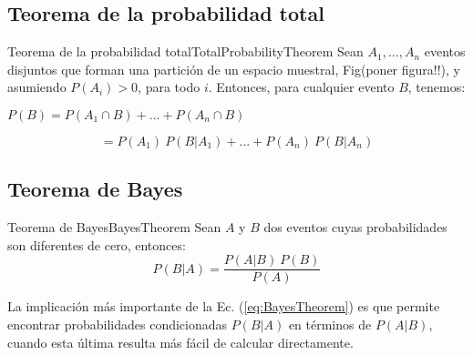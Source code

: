 \subsection{Teorema de la probabilidad total}
\begin{theorem}{Teorema de la probabilidad total}{TotalProbabilityTheorem}
Sean $A_1, ..., A_n$ eventos disjuntos que forman una partición de un espacio
muestral, Fig(poner figura!!), y asumiendo $P(A_i)>0$, para todo $i$. Entonces,
para cualquier evento $B$, tenemos:

\begin{center}
    $P(B) = P(A_1 \cap B) + ... + P(A_n \cap B)$
\end{center}

\begin{equation}
    =P(A_1)\ P(B|A_1) + ... + P(A_n) \ P(B|A_n)
\end{equation}

\end{theorem}


\subsection{Teorema de Bayes}

\begin{theorem}{Teorema de Bayes}{BayesTheorem}
Sean $A$ y $B$ dos eventos cuyas probabilidades son diferentes de cero,
entonces:
    \begin{equation}
        P(B|A) = \frac{P(A|B) \ P(B)}{P(A)}
        \label{eq:BayesTheorem}
    \end{equation}

La implicación más importante de la Ec. (\ref{eq:BayesTheorem}) es que permite
encontrar probabilidades condicionadas $P(B|A)$ en términos de $P(A|B)$, cuando
esta última resulta más fácil de calcular directamente.
\end{theorem}

